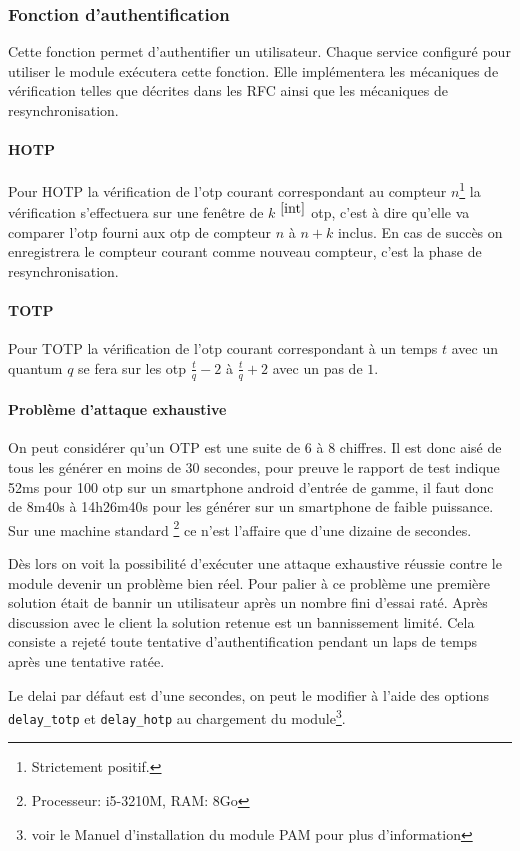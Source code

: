 \subsubsection{Fonction d'authentification}
Cette fonction permet d'authentifier un utilisateur. Chaque service configuré
pour utiliser le module exécutera cette fonction. Elle implémentera les
mécaniques de vérification telles que décrites dans les RFC ainsi que les
mécaniques de resynchronisation.
\paragraph{HOTP}
Pour HOTP la vérification de l'otp courant correspondant au compteur
$n$\footnote{Strictement positif.\label{int}} la vérification s'effectuera sur
une fenêtre de  $k$ $^{\ref{int}}$ otp, c'est à dire qu'elle va comparer l'otp
fourni aux otp de compteur $n$ à $n+k$ inclus. En cas de succès on enregistrera
le compteur courant comme nouveau compteur, c'est la phase de resynchronisation.
\paragraph{TOTP}
Pour TOTP la vérification de l'otp courant correspondant à un temps $t$ avec un
quantum $q$ se fera sur les otp $\frac{t}{q} - 2$ à $\frac{t}{q} + 2$ avec un
pas de $1$.
\paragraph{Problème d'attaque exhaustive}
On peut considérer qu'un OTP est une suite de 6 à 8 chiffres. Il est donc aisé
de tous les générer en moins de 30 secondes, pour preuve le rapport de test
indique 52ms pour 100 otp sur un smartphone android d'entrée de gamme,
il faut donc de 8m40s à 14h26m40s pour les générer sur un smartphone de faible
puissance. Sur une machine standard \footnote{Processeur: i5-3210M, RAM: 8Go} ce
n'est l'affaire que d'une dizaine de secondes.

Dès lors on voit la possibilité d'exécuter une attaque exhaustive réussie contre
le module devenir un problème bien réel. Pour palier à ce problème une première
solution était de bannir un utilisateur après un nombre fini d'essai raté. Après
discussion avec le client la solution retenue est un bannissement limité. Cela
consiste a rejeté toute tentative d'authentification pendant un laps de temps
après une tentative ratée.

Le delai par défaut est d'une secondes, on peut le modifier à l'aide des options
\verb?delay_totp? et \verb?delay_hotp? au chargement du module\footnote{voir le
Manuel d'installation du module PAM pour plus d'information}.

